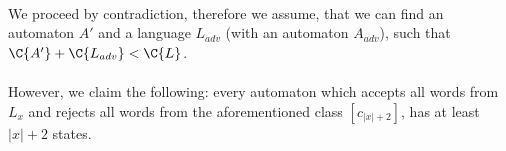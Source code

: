 \paragraph{}
We proceed by contradiction, therefore we assume, that we can find an automaton $A'$ and a language $L_{adv}$ (with an automaton $A_{adv}$), such that $\C{A'} + \C{L_{adv}} < \C{L}$. 

\paragraph{}
However, we claim the following: every automaton which accepts all words from $L_x$ and rejects all words from the aforementioned class $[c_{|x|+2}]$, has at least $|x|+2$ states. 




